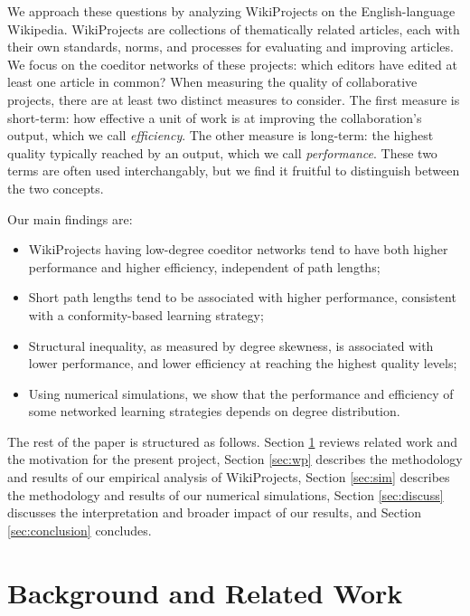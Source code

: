 We approach these questions by analyzing WikiProjects on the English-language Wikipedia.
WikiProjects are collections of thematically related articles,
each with their own standards, norms, and processes for evaluating and improving articles.
We focus on the coeditor networks of these projects:
which editors have edited at least one article in common?
When measuring the quality of collaborative projects,
there are at least two distinct measures to consider.
The first measure is short-term:
how effective a unit of work is at improving
the collaboration's output,
which we call {\em efficiency}.
The other measure is long-term:
the highest quality typically reached by an output,
which we call {\em performance}.
These two terms are often used interchangably,
but we find it fruitful to distinguish between the two concepts.

Our main findings are:
\begin{itemize}
\item WikiProjects having low-degree coeditor networks tend to have both higher performance and higher efficiency, independent of path lengths;
\item Short path lengths tend to be associated with higher performance, consistent with a conformity-based learning strategy;
\item Structural inequality, as measured by degree skewness, is associated with lower performance,
and lower efficiency at reaching the highest quality levels;
\item Using numerical simulations, we show that the performance and efficiency of some networked learning strategies depends on degree distribution.
\end{itemize}

The rest of the paper is structured as follows.
Section \ref{sec:background} reviews related work and the motivation for the present project,
Section \ref{sec:wp} describes the methodology and results of our empirical analysis of WikiProjects,
Section \ref{sec:sim} describes the methodology and results of our numerical simulations,
Section \ref{sec:discuss} discusses the interpretation and broader impact of our results,
and Section \ref{sec:conclusion} concludes.

\section{Background and Related Work}
\label{sec:background}

